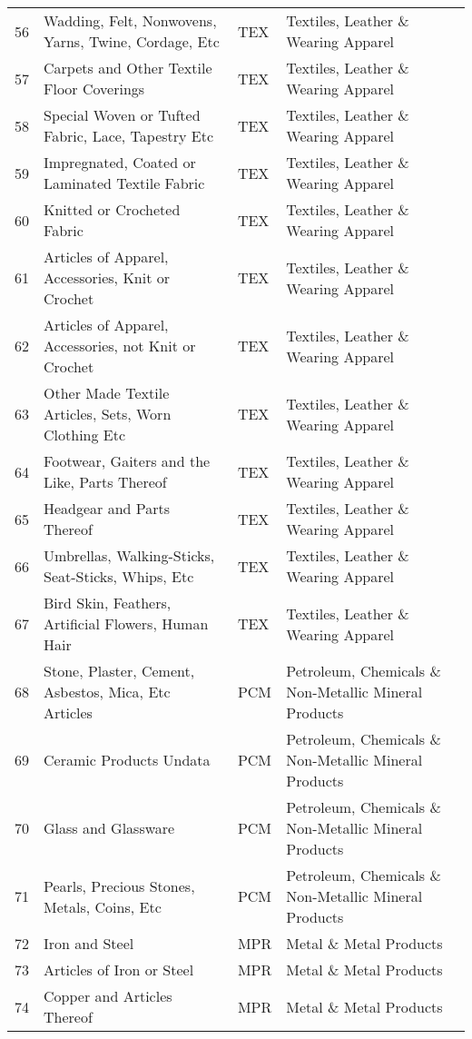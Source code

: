 \documentclass[a4paper]{article}
\begin{document}
\begin{table}[ht]
{\begin{tabular}{rlll}
  56 & Wadding, Felt, Nonwovens, Yarns, Twine, Cordage, Etc & TEX & Textiles, Leather \& Wearing Apparel \\ 
  57 & Carpets and Other Textile Floor Coverings & TEX & Textiles, Leather \& Wearing Apparel \\ 
  58 & Special Woven or Tufted Fabric, Lace, Tapestry Etc & TEX & Textiles, Leather \& Wearing Apparel \\ 
  59 & Impregnated, Coated or Laminated Textile Fabric & TEX & Textiles, Leather \& Wearing Apparel \\ 
  60 & Knitted or Crocheted Fabric & TEX & Textiles, Leather \& Wearing Apparel \\ 
  61 & Articles of Apparel, Accessories, Knit or Crochet & TEX & Textiles, Leather \& Wearing Apparel \\ 
  62 & Articles of Apparel, Accessories, not Knit or Crochet & TEX & Textiles, Leather \& Wearing Apparel \\ 
  63 & Other Made Textile Articles, Sets, Worn Clothing Etc & TEX & Textiles, Leather \& Wearing Apparel \\ 
  64 & Footwear, Gaiters and the Like, Parts Thereof & TEX & Textiles, Leather \& Wearing Apparel \\ 
  65 & Headgear and Parts Thereof & TEX & Textiles, Leather \& Wearing Apparel \\ 
  66 & Umbrellas, Walking-Sticks, Seat-Sticks, Whips, Etc & TEX & Textiles, Leather \& Wearing Apparel \\ 
  67 & Bird Skin, Feathers, Artificial Flowers, Human Hair & TEX & Textiles, Leather \& Wearing Apparel \\ 
  68 & Stone, Plaster, Cement, Asbestos, Mica, Etc Articles & PCM & Petroleum, Chemicals \& Non-Metallic Mineral Products \\ 
  69 & Ceramic Products Undata & PCM & Petroleum, Chemicals \& Non-Metallic Mineral Products \\ 
  70 & Glass and Glassware & PCM & Petroleum, Chemicals \& Non-Metallic Mineral Products \\ 
  71 & Pearls, Precious Stones, Metals, Coins, Etc & PCM & Petroleum, Chemicals \& Non-Metallic Mineral Products \\ 
  72 & Iron and Steel & MPR & Metal \& Metal Products \\ 
  73 & Articles of Iron or Steel & MPR & Metal \& Metal Products \\ 
  74 & Copper and Articles Thereof & MPR & Metal \& Metal Products \\ 

\end{tabular}}
\end{table}
\end{document}

